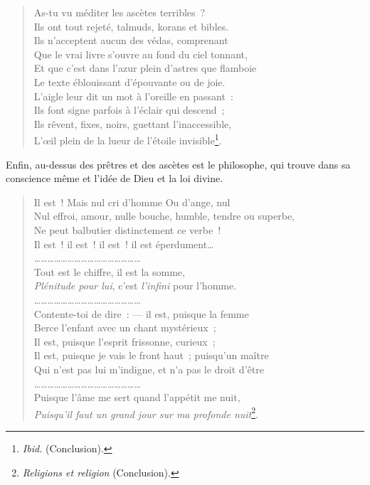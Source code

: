 \documentclass[french,twoside]{book} %
\begin{document}
\begin{verse}
As-tu vu méditer les ascètes terribles ?\\
Ils ont tout rejeté, talmuds, korans et bibles.\\
Ils n’acceptent aucun des védas, comprenant\\
Que le vrai livre s’ouvre au fond du ciel tonnant,\\
Et que c’est dans l’azur plein d’astres que flamboie\\
Le texte éblouissant d’épouvante ou de joie.\\
L’aigle leur dit un mot à l’oreille en passant :\\
Ils font signe parfois à l’éclair qui descend ;\\
Ils rêvent, fixes, noirs, guettant l’inaccessible,\\
L’œil plein de la lueur de l’étoile invisible\footnote{\emph{Ibid.} (Conclusion).}.\\
\end{verse}

\noindent Enfin, au-dessus des prêtres et des ascètes est le philosophe, qui trouve dans sa conscience même et l’idée de Dieu et la loi divine.\par


\begin{verse}
Il est ! Mais nul cri d’homme Ou d’ange, nul\\
Nul effroi, amour, nulle bouche, humble, tendre ou superbe,\\
Ne peut balbutier distinctement ce verbe !\\
Il est ! il est ! il est ! il est éperdument…\\
…………………………………………\\
Tout est le chiffre, il est la somme,\\
\emph{Plénitude pour lui}, c’est \emph{l’infini} pour l’homme.\\
…………………………………………\\
Contente-toi de dire : — il est, puisque la femme\\
Berce l’enfant avec un chant mystérieux ;\\
Il est, puisque l’esprit frissonne, curieux ;\\
Il est, puisque je vais le front haut ; puisqu’un maître\\
Qui n’est pas lui m’indigne, et n’a pas le droit d’être\\
…………………………………………\\
Puisque l’âme me sert quand l’appétit me nuit,\\
\emph{Puisqu’il faut un grand jour sur ma profonde nuit}\footnote{\emph{Religions et religion} (Conclusion).}.\\
\end{verse}
\end{document}
